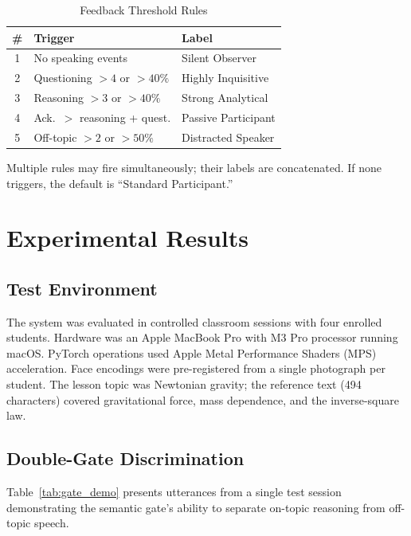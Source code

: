\documentclass[conference]{IEEEtran}
\begin{document}
\begin{table}[htbp]
\caption{Feedback Threshold Rules}
\begin{center}
\begin{tabular}{|c|p{3.4cm}|p{2.6cm}|}
\hline
\textbf{\#} & \textbf{Trigger} & \textbf{Label} \\
\hline
1 & No speaking events & Silent Observer \\
\hline
2 & Questioning $> 4$ or $> 40\%$ & Highly Inquisitive \\
\hline
3 & Reasoning $> 3$ or $> 40\%$ & Strong Analytical \\
\hline
4 & Ack.\ $>$ reasoning + quest. & Passive Participant \\
\hline
5 & Off-topic $> 2$ or $> 50\%$ & Distracted Speaker \\
\hline
\end{tabular}
\label{tab:feedback}
\end{center}
\end{table}

Multiple rules may fire simultaneously; their labels are concatenated. If none triggers, the default is ``Standard Participant.''

\section{Experimental Results}

\subsection{Test Environment}
The system was evaluated in controlled classroom sessions with four enrolled students. %
Hardware was an Apple MacBook Pro with M3 Pro processor running macOS. PyTorch operations used Apple Metal Performance Shaders (MPS) acceleration. Face encodings were pre-registered from a single photograph per student. The lesson topic was Newtonian gravity; the reference text (494 characters) covered gravitational force, mass dependence, and the inverse-square law.

\subsection{Double-Gate Discrimination}
Table~\ref{tab:gate_demo} presents utterances from a single test session demonstrating the semantic gate's ability to separate on-topic reasoning from off-topic speech.
\end{document}
